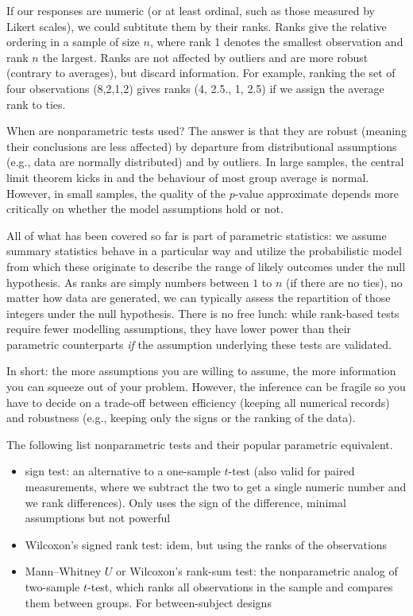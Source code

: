 \documentclass[
  11pt,
  letterpaper,
]{scrbook}
\providecommand{\tightlist}{%
  \setlength{\itemsep}{0pt}\setlength{\parskip}{0pt}}\usepackage{longtable,booktabs,array}
\theoremstyle{definition}
\theoremstyle{remark}
\begin{document}
If our responses are numeric (or at least ordinal, such as those
measured by Likert scales), we could subtitute them by their ranks.
Ranks give the relative ordering in a sample of size \(n\), where rank 1
denotes the smallest observation and rank \(n\) the largest. Ranks are
not affected by outliers and are more robust (contrary to averages), but
discard information. For example, ranking the set of four observations
(8,2,1,2) gives ranks (4, 2.5., 1, 2.5) if we assign the average rank to
ties.

When are nonparametric tests used? The answer is that they are robust
(meaning their conclusions are less affected) by departure from
distributional assumptions (e.g., data are normally distributed) and by
outliers. In large samples, the central limit theorem kicks in and the
behaviour of most group average is normal. However, in small samples,
the quality of the \(p\)-value approximate depends more critically on
whether the model assumptions hold or not.

All of what has been covered so far is part of parametric statistics: we
assume summary statistics behave in a particular way and utilize the
probabilistic model from which these originate to describe the range of
likely outcomes under the null hypothesis. As ranks are simply numbers
between \(1\) to \(n\) (if there are no ties), no matter how data are
generated, we can typically assess the repartition of those integers
under the null hypothesis. There is no free lunch: while rank-based
tests require fewer modelling assumptions, they have lower power than
their parametric counterparts \emph{if} the assumption underlying these
tests are validated.

In short: the more assumptions you are willing to assume, the more
information you can squeeze out of your problem. However, the inference
can be fragile so you have to decide on a trade-off between efficiency
(keeping all numerical records) and robustness (e.g., keeping only the
signs or the ranking of the data).

The following list nonparametric tests and their popular parametric
equivalent.

\begin{itemize}
\tightlist
\item
  sign test: an alternative to a one-sample \(t\)-test (also valid for
  paired measurements, where we subtract the two to get a single numeric
  number and we rank differences). Only uses the sign of the difference,
  minimal assumptions but not powerful
\item
  Wilcoxon's signed rank test: idem, but using the ranks of the
  observations
\item
  Mann--Whitney \(U\) or Wilcoxon's rank-sum test: the nonparametric
  analog of two-sample \(t\)-test, which ranks all observations in the
  sample and compares them between groups. For between-subject designs
\end{itemize}
\end{document}
